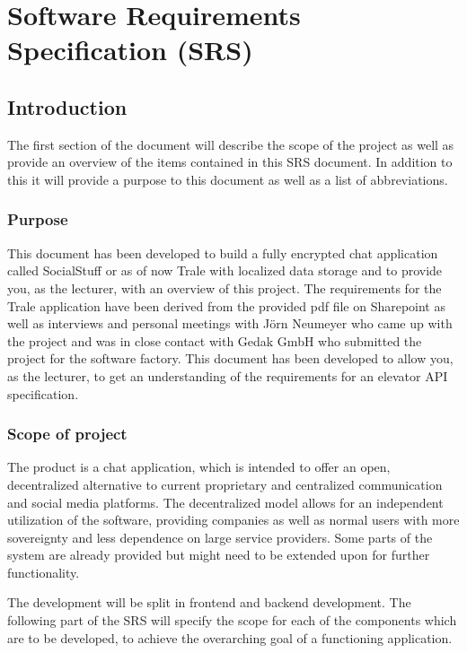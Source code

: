 

\chapter{Software Requirements Specification (SRS)}\label{ch:software-requirements-specification-(srs)}


\section{Introduction}\label{sec:introduction}
The first section of the document will describe the scope of the project as well as provide an overview of the items
contained in this SRS document.
In addition to this it will provide a purpose to this document as well as a list of abbreviations.

\subsection{Purpose}\label{subsec:purpose}
This document has been developed to build a fully encrypted chat application called SocialStuff or as of now Trale with
localized data storage and to provide you, as the lecturer, with an overview of this project.
The requirements for the Trale application have been derived from the provided pdf file on Sharepoint as well as
interviews and personal meetings with J\"orn Neumeyer who came up with the project and was in close contact with Gedak
GmbH who submitted the project for the software factory.
This document has been developed to allow you, as the lecturer, to get an understanding of the requirements for an
elevator API specification.

\subsection{Scope of project}\label{subsec:scope-of-project}
The product is a chat application, which is intended to offer an open, decentralized alternative to current proprietary
and centralized communication and social media platforms.
The decentralized model allows for an independent utilization of the software, providing companies as well as normal
users with more sovereignty and less dependence on large service providers.
Some parts of the system are already provided but might need to be extended upon for further functionality.

The development will be split in frontend and backend development.
The following part of the SRS will specify the scope for each of the components which are to be developed, to achieve
the overarching goal of a functioning application.

